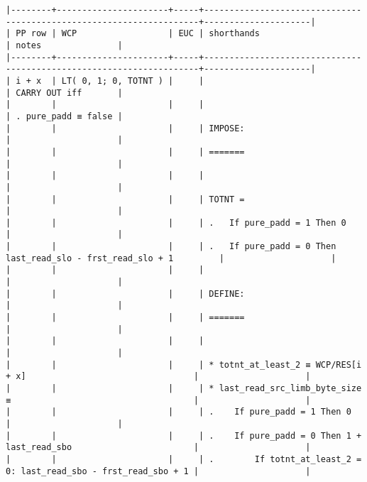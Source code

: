 \documentclass[varwidth=\maxdimen,margin=0.5cm,multi={verbatim}]{standalone}
\begin{document}
\begin{verbatim}
|--------+----------------------+-----+---------------------------------------------------------------------+---------------------|
| PP row | WCP                  | EUC | shorthands                                                          | notes               |
|--------+----------------------+-----+---------------------------------------------------------------------+---------------------|
| i + x  | LT( 0, 1; 0, TOTNT ) |     |                                                                     | CARRY OUT iff       |
|        |                      |     |                                                                     | . pure_padd ≡ false |
|        |                      |     | IMPOSE:                                                             |                     |
|        |                      |     | =======                                                             |                     |
|        |                      |     |                                                                     |                     |
|        |                      |     | TOTNT =                                                             |                     |
|        |                      |     | .   If pure_padd = 1 Then 0                                         |                     |
|        |                      |     | .   If pure_padd = 0 Then last_read_slo - frst_read_slo + 1         |                     |
|        |                      |     |                                                                     |                     |
|        |                      |     | DEFINE:                                                             |                     |
|        |                      |     | =======                                                             |                     |
|        |                      |     |                                                                     |                     |
|        |                      |     | * totnt_at_least_2 ≡ WCP/RES[i + x]                                 |                     |
|        |                      |     | * last_read_src_limb_byte_size ≡                                    |                     |
|        |                      |     | .    If pure_padd = 1 Then 0                                        |                     |
|        |                      |     | .    If pure_padd = 0 Then 1 + last_read_sbo                        |                     |
|        |                      |     | .        If totnt_at_least_2 = 0: last_read_sbo - frst_read_sbo + 1 |                     |

\end{verbatim}
\end{document}
